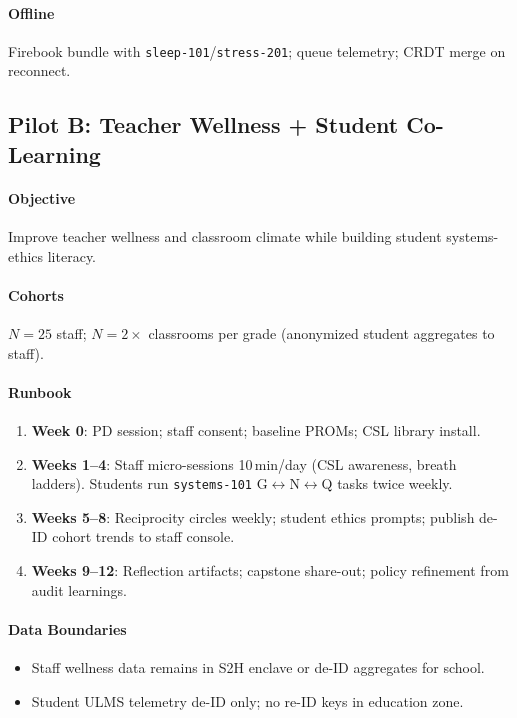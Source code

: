 \documentclass[11pt]{article}
\theoremstyle{plain}
\begin{document}
\paragraph{Offline}
Firebook bundle with \texttt{sleep-101}/\texttt{stress-201}; queue telemetry; CRDT merge on reconnect.

\subsection{Pilot B: Teacher Wellness + Student Co-Learning}\label{pilot:teacher}
\paragraph{Objective}
Improve teacher wellness and classroom climate while building student systems-ethics literacy.

\paragraph{Cohorts}
$N=25$ staff; $N=2\times$ classrooms per grade (anonymized student aggregates to staff).

\paragraph{Runbook}
\begin{enumerate}
  \item \textbf{Week 0}: PD session; staff consent; baseline PROMs; CSL library install.
  \item \textbf{Weeks 1--4}: Staff micro-sessions 10\,min/day (CSL awareness, breath ladders). Students run \texttt{systems-101} G$\leftrightarrow$N$\leftrightarrow$Q tasks twice weekly.
  \item \textbf{Weeks 5--8}: Reciprocity circles weekly; student ethics prompts; publish de-ID cohort trends to staff console.
  \item \textbf{Weeks 9--12}: Reflection artifacts; capstone share-out; policy refinement from audit learnings.
\end{enumerate}

\paragraph{Data Boundaries}
\begin{itemize}
  \item Staff wellness data remains in S2H enclave or de-ID aggregates for school.
  \item Student ULMS telemetry de-ID only; no re-ID keys in education zone.
\end{itemize}
\end{document}
